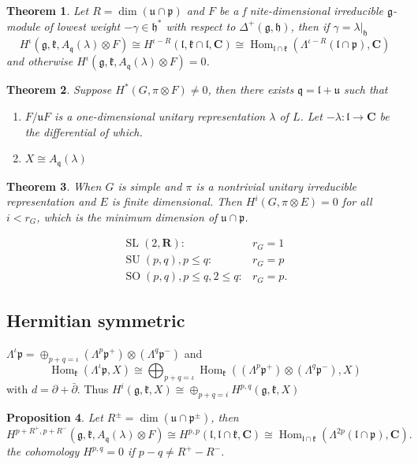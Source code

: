 \documentclass[leqno]{amsart}
\DeclareMathOperator{\SL}{SL}
\DeclareMathOperator{\SU}{SU}
\DeclareMathOperator{\SO}{SO}
\newcommand{\R}{\mathbf R}
\newcommand{\C}{\mathbf C}
\newcommand{\1}{\mathbf{1}}
\newcommand{\cfg}{\mathfrak{g}}
\newcommand{\cfh}{\mathfrak{h}}
\newcommand{\cfk}{\mathfrak{k}}
\newcommand{\cfp}{\mathfrak{p}}
\newcommand{\cfq}{\mathfrak{q}}
\newcommand{\cfu}{\mathfrak{u}}
\newcommand{\cfl}{\mathfrak{l}}
\DeclareMathOperator{\Hom}{Hom}
\newtheorem{thm}{Theorem}[section]
\newtheorem{prop}[thm]{Proposition}
\theoremstyle{definition}
\theoremstyle{remark}
\begin{document}
\begin{thm}
	Let $R=\dim(\cfu\cap\cfp)$
	and $F$ be a f nite-dimensional irreducible $\cfg$-module
	of lowest weight $-\gamma\in \cfh^*$
	with respect to  $\Delta^+(\cfg,\cfh)$,
	then if $\gamma=\lambda\vert_{\cfh}$
	\[
		H^\iota(\cfg,\cfk,A_\cfq(\lambda)\otimes F)\cong
		H^{\iota-R}(\cfl,\cfk\cap\cfl,\C)\cong
		\Hom_{\cfl\cap\cfk}
		(\Lambda^{\iota-R}(\cfl\cap\cfp), \C)
	\]
	and otherwise
	$H^\iota(\cfg,\cfk,A_\cfq(\lambda)\otimes F)=0$.
\end{thm}

\begin{thm}
	Suppose $H^*(G,\pi\otimes F)\neq 0$,
	then there exists  $\cfq=\cfl+\cfu$ such that
	 \begin{enumerate}[label=(\alph*)]
		\item $F/\cfu F$ is a one-dimensional 
			unitary representation $\lambda$ of $L$.
			Let $-\lambda\colon \cfl\to \C$
			be the differential of which.
		\item  $X\cong A_\cfq(\lambda)$
	\end{enumerate}
\end{thm}

\begin{thm}
	When $G$ is simple and  $\pi$ is a nontrivial
	unitary irreducible representation
	and  $E$ is finite dimensional.
	Then  $H^i(G,\pi\otimes E)=0$ 
	for all $i<r_G$, which is the minimum dimension
	of  $\cfu\cap \cfp$.
\end{thm}
\begin{align*}
	\SL(2,\R)\colon & r_G=1\\
	\SU(p,q),p\leq q\colon& r_G=p\\
	\SO(p,q),p\leq q,2\leq q\colon& r_G=p.
\end{align*}

\subsection{Hermitian symmetric}

$\Lambda^\iota\cfp=\oplus_{p+q=\iota}(\Lambda^p\cfp^+)
\otimes(\Lambda^q\cfp^-)$ and
\[
	\Hom_\cfk(\Lambda^\iota\cfp,X)\cong
	\bigoplus_{p+q=\iota}
	\Hom_\cfk((\Lambda^p\cfp^+) \otimes(\Lambda^q\cfp^-),X)
\]
with $d=\partial+\bar{\partial}$.
Thus 
$H^i(\cfg,\cfk,X)\cong \oplus_{p+q=i}H^{p,q}(\cfg,\cfk,X)$

\begin{prop}
	Let $R^{\pm}=\dim(\cfu\cap\cfp^\pm)$, 
	then
	\[
		H^{p+R^+,p+R^-}(\cfg,\cfk,A_\cfq(\lambda)\otimes F)
		\cong H^{p,p}(\cfl,\cfl\cap\cfk,\C)
		\cong \Hom_{\cfl\cap\cfk}
		(\Lambda^{2p}(\cfl\cap\cfp),\C).
	\]
	the cohomology $H^{p,q}=0$ 
	if $p-q\neq R^+-R^-$.
\end{prop}
\end{document}
